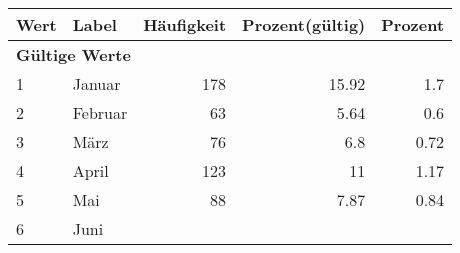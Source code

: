     \begin{longtable}{lXrrr}
     \toprule
     \textbf{Wert} & \textbf{Label} & \textbf{Häufigkeit} & \textbf{Prozent(gültig)} & \textbf{Prozent} \\
     \endhead
     \midrule
     \multicolumn{5}{l}{\textbf{Gültige Werte}}\\

     1 &
     \multicolumn{1}{X}{ Januar   } &


       \num{178} &
       \num[round-mode=places,round-precision=2]{15,92} &
         \num[round-mode=places,round-precision=2]{1,7} \\

     2 &
     \multicolumn{1}{X}{ Februar   } &


       \num{63} &
       \num[round-mode=places,round-precision=2]{5,64} &
         \num[round-mode=places,round-precision=2]{0,6} \\

     3 &
     \multicolumn{1}{X}{ März   } &


       \num{76} &
       \num[round-mode=places,round-precision=2]{6,8} &
         \num[round-mode=places,round-precision=2]{0,72} \\

     4 &
     \multicolumn{1}{X}{ April   } &


       \num{123} &
       \num[round-mode=places,round-precision=2]{11} &
         \num[round-mode=places,round-precision=2]{1,17} \\

     5 &
     \multicolumn{1}{X}{ Mai   } &


       \num{88} &
       \num[round-mode=places,round-precision=2]{7,87} &
         \num[round-mode=places,round-precision=2]{0,84} \\

     6 &
     \multicolumn{1}{X}{ Juni   } &



\end{longtable}
